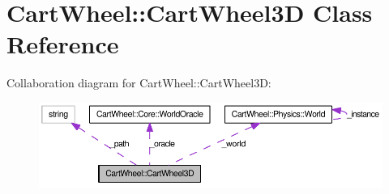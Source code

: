 \hypertarget{classCartWheel_1_1CartWheel3D}{
\section{CartWheel::CartWheel3D Class Reference}
\label{classCartWheel_1_1CartWheel3D}
}


Collaboration diagram for CartWheel::CartWheel3D:\nopagebreak
\begin{figure}[H]
\begin{center}
\leavevmode
\includegraphics[width=400pt]{classCartWheel_1_1CartWheel3D__coll__graph}
\end{center}
\end{figure}
